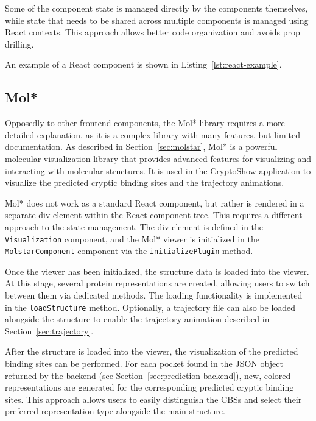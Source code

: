 Some of the component state is managed directly by the components themselves, while state that needs to be shared across multiple components is managed using React contexts. This approach allows better code organization and avoids prop drilling.

An example of a React component is shown in Listing~\ref{lst:react-example}.



\subsection{Mol*}
\label{sec:molstar-frontend}

Opposedly to other frontend components, the Mol* library requires a more detailed explanation, as it is a complex library with many features, but limited documentation. As described in Section~\ref{sec:molstar}, Mol* is a powerful molecular visualization library that provides advanced features for visualizing and interacting with molecular structures. It is used in the CryptoShow application to visualize the predicted cryptic binding sites and the trajectory animations.

Mol* does not work as a standard React component, but rather is rendered in a separate div element within the React component tree. This requires a different approach to the state management. The div element is defined in the \lstinline|Visualization| component, and the Mol* viewer is initialized in the \lstinline|MolstarComponent| component via the \lstinline|initializePlugin| method.

Once the viewer has been initialized, the structure data is loaded into the viewer. At this stage, several protein representations are created, allowing users to switch between them via dedicated methods. The loading functionality is implemented in the \lstinline|loadStructure| method. Optionally, a trajectory file can also be loaded alongside the structure to enable the trajectory animation described in Section~\ref{sec:trajectory}.

After the structure is loaded into the viewer, the visualization of the predicted binding sites can be performed. For each pocket found in the JSON object returned by the backend (see Section~\ref{sec:prediction-backend}), new, colored representations are generated for the corresponding predicted cryptic binding sites. This approach allows users to easily distinguish the CBSs and select their preferred representation type alongside the main structure.

